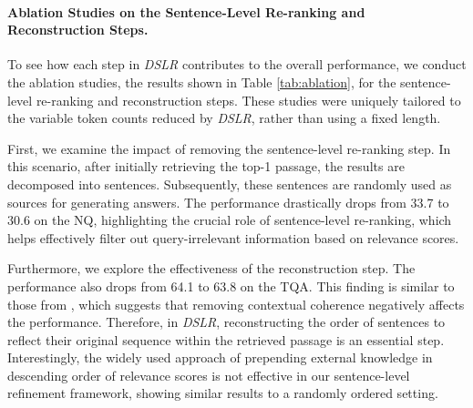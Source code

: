 \paragraph{Ablation Studies on the Sentence-Level Re-ranking and Reconstruction Steps.}
To see how each step in \textit{DSLR} contributes to the overall performance, we conduct the ablation studies, the results shown in Table \ref{tab:ablation}, for the sentence-level re-ranking and reconstruction steps. These studies were uniquely tailored to the variable token counts reduced by \textit{DSLR}, rather than using a fixed length.

First, we examine the impact of removing the sentence-level re-ranking step. In this scenario, after initially retrieving the top-1 passage, the results are decomposed into sentences. Subsequently, these sentences are randomly used as sources for generating answers. The performance drastically drops from 33.7 to 30.6 on the NQ, highlighting the crucial role of sentence-level re-ranking, which helps effectively filter out query-irrelevant information based on relevance scores.


Furthermore, we explore the effectiveness of the reconstruction step. The performance also drops from 64.1 to 63.8 on the TQA. This finding is similar to those from \citet{decontextualization}, which suggests that removing contextual coherence negatively affects the performance. Therefore, in \textit{DSLR}, reconstructing the order of sentences to reflect their original sequence within the retrieved passage is an essential step. Interestingly, the widely used approach of prepending external knowledge in descending order of relevance scores is not effective in our sentence-level refinement framework, showing similar results to a randomly ordered setting. 

